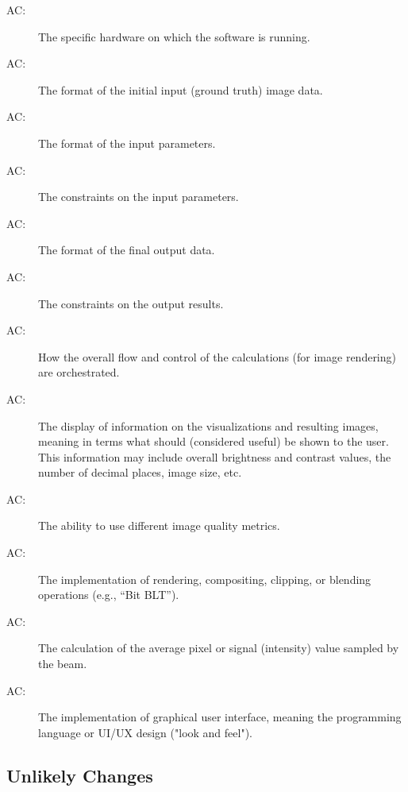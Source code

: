 \documentclass[12pt, titlepage]{article}
\newcounter{acnum}
\newcommand{\actheacnum}{AC\theacnum}
\begin{document}
\begin{description}
  \item[ \actheacnum \label{AC_hardware}:] The specific
    hardware on which the software is running.
  \item[ \actheacnum \label{AC_inImage}:] The format of the
    initial input (ground truth) image data.
  \item[ \actheacnum \label{AC_inParamsFormat}:] The format of the input parameters.
  \item[ \actheacnum \label{AC_inParamsVerif}:] The constraints on the input parameters.
  \item[ \actheacnum \label{AC_outFormat}:] The format of the final output data.
  \item[ \actheacnum \label{AC_outVerif}:] The constraints on the output results.
  \item[ \actheacnum \label{AC_calc}:] How the overall flow and control of the
    calculations (for image rendering) are orchestrated.
  \item[ \actheacnum \label{AC_dispInfo}:] The display of information 
    on the visualizations and resulting images, meaning in terms what should (considered
    useful) be shown to the user. This information may include overall brightness and
    contrast values, the number of decimal places, image size, etc.
  \item[ \actheacnum \label{AC_imgMetricAlgos}:] The ability
    to use different image quality metrics.
  \item[ \actheacnum \label{AC_maskOpts}:] The implementation of rendering,
    compositing, clipping, or blending operations (e.g., ``Bit BLT'').
  \item[ \actheacnum \label{AC_calcSignal}:] The calculation of the
    average pixel or signal (intensity) value sampled by the beam.
  \item[ \actheacnum \label{AC_GUI}:] The implementation of graphical user
    interface, meaning the programming language or UI/UX design ("look and feel").
\end{description}

\subsection{Unlikely Changes} \label{SecUchange}
\end{document}
